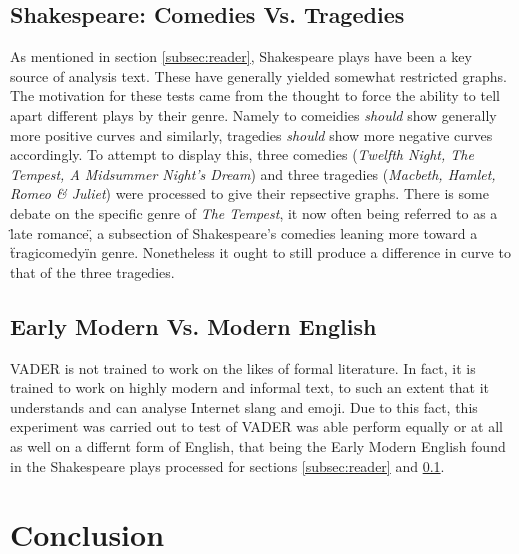 \documentclass{article}
\begin{document}
    \subsection{Shakespeare: Comedies Vs. Tragedies}
    \label{subsec:comVsTrag}
        As mentioned in section \ref{subsec:reader}, Shakespeare plays have been a key source of analysis text. These have generally yielded somewhat restricted graphs. The motivation for these tests came from the thought to force the ability to tell apart different plays by their genre. Namely to comeidies \emph{should} show generally more positive curves and similarly, tragedies \emph{should} show more negative curves accordingly. To attempt to display this, three comedies (\emph{Twelfth Night, The Tempest, A Midsummer Night's Dream}) and three tragedies (\emph{Macbeth, Hamlet, Romeo \& Juliet}) were processed to give their repsective graphs. There is some debate on the specific genre of \emph{The Tempest}, it now often being referred to as a \"late romance\", a subsection of Shakespeare's comedies leaning more toward a \"tragicomedy\" in genre. Nonetheless it ought to still produce a difference in curve to that of the three tragedies.
    \subsection{Early Modern Vs. Modern English}
        VADER is not trained to work on the likes of formal literature. In fact, it is trained to work on highly modern and informal text, to such an extent that it understands and can analyse Internet slang and emoji. Due to this fact, this experiment was carried out to test of VADER was able perform equally or at all as well on a differnt form of English, that being the Early Modern English found in the Shakespeare plays processed for sections \ref{subsec:reader} and \ref{subsec:comVsTrag}.
\newpage
\section{Conclusion}
\newpage


\end{document}
